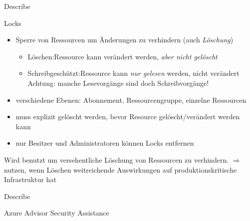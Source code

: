 \documentclass{scrartcl}
\newenvironment{flashcard}[2][]{%
    #1
    \vfill
    \centerline{\Large{#2}}
    \vfill
\newpage
}
{\newpage}
\begin{document}
    \begin{flashcard}[Describe]{Locks}
        \begin{itemize}
            \item Sperre von Ressourcen um Änderungen zu verhindern (auch \emph{Löschung})
            \begin{itemize}
                \item Löschen:\newline Ressource kann verändert werden, \emph{aber nicht gelöscht}
                \item Schreibgeschützt:\newline Ressource kann \emph{nur gelesen} werden, nicht verändert\newline
                Achtung: manche Lesevorgänge sind doch Schreibvorgänge!
            \end{itemize}
            \item verschiedene Ebenen: Abonnement, Ressourcengruppe, einzelne Ressourcen
            \item muss explizit gelöscht werden, bevor Resource gelöscht/verändert werden kann
            \item nur Besitzer und Administratoren können Locks entfernen
        \end{itemize}
        
        Wird benutzt um versehentliche Löschung von Ressourcen zu verhindern. \newline
        $\Rightarrow$ nutzen, wenn Löschen weitreichende Auswirkungen auf produktionskritische Infrastruktur hat

    \end{flashcard}

    \begin{flashcard}[Describe]{Azure Advisor Security Assistance}

    \end{flashcard}
\end{document}
